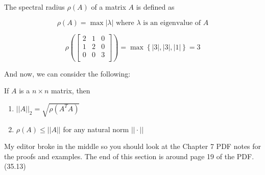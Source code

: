  The spectral radius $\rho(A)$ of a matrix $A$ is defined as

\begin{equation*}
  \rho(A) = \max \left|\lambda\right| \text{ where } \lambda \text{ is an eigenvalue of } A
\end{equation*}

\ex

\begin{equation*}
  \rho(\begin{bmatrix}
  2 & 1 & 0\\
  1 & 2 & 0\\
  0 & 0 & 3\\
  \end{bmatrix}) = \max \left\{ |3|, |3|, |1| \right\} = 3
\end{equation*}

And now, we can consider the following:

\pagebreak
\thm If $A$ is a $n \times n$ matrix, then

\begin{enumerate}
  \item $||A||_2 = \sqrt{\rho(A^T A)}$
  \item $\rho(A) \leq ||A||$ for any natural norm $||\cdot||$
\end{enumerate}

My editor broke in the middle so you should look at the Chapter 7 PDF notes
for the proofs and examples. The end of this section is around page 19 of 
the PDF. (35.13)

